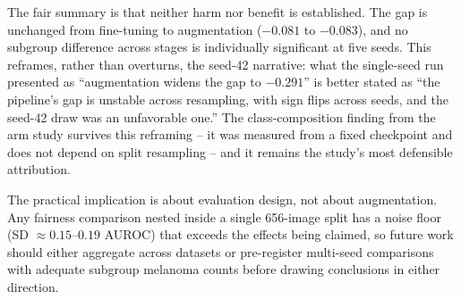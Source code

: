 The fair summary is that neither harm nor benefit is established. The gap is unchanged from fine-tuning to augmentation ($-0.081$ to $-0.083$), and no subgroup difference across stages is individually significant at five seeds. This reframes, rather than overturns, the seed-42 narrative: what the single-seed run presented as ``augmentation widens the gap to $-0.291$'' is better stated as ``the pipeline's gap is unstable across resampling, with sign flips across seeds, and the seed-42 draw was an unfavorable one.'' The class-composition finding from the arm study survives this reframing -- it was measured from a fixed checkpoint and does not depend on split resampling -- and it remains the study's most defensible attribution.

The practical implication is about evaluation design, not about augmentation. Any fairness comparison nested inside a single 656-image split has a noise floor (SD $\approx 0.15$--$0.19$ AUROC) that exceeds the effects being claimed, so future work should either aggregate across datasets or pre-register multi-seed comparisons with adequate subgroup melanoma counts before drawing conclusions in either direction.
